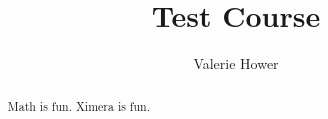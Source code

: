 \documentclass{xourse}
\title{Test Course}
\author{Valerie Hower}
\begin{document}
\begin{abstract}
Math is fun.  Ximera is fun.
\end{abstract}
\maketitle

\setcounter{tocdepth}{2}

\chapterstyle
{} 
\end{document}
